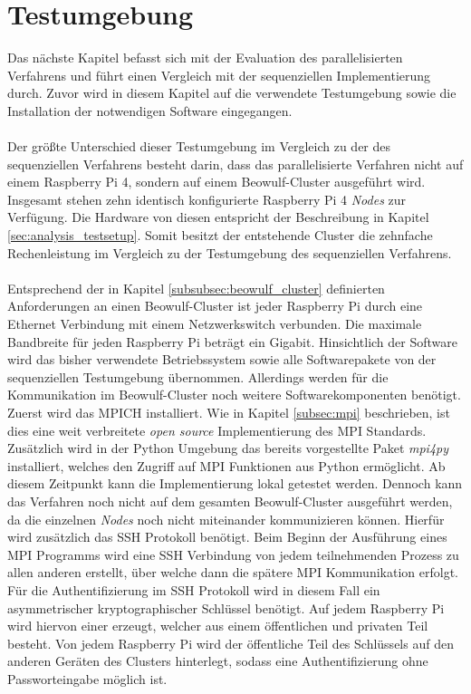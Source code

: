\section{Testumgebung}
\label{sec:test_env_parallel}
Das nächste Kapitel befasst sich mit der Evaluation des parallelisierten Verfahrens und führt einen Vergleich mit der sequenziellen Implementierung durch. Zuvor wird in diesem Kapitel auf die verwendete Testumgebung sowie die Installation der notwendigen Software eingegangen. 
\\\\
Der größte Unterschied dieser Testumgebung im Vergleich zu der des sequenziellen Verfahrens besteht darin, dass das parallelisierte Verfahren nicht auf einem Raspberry Pi 4, sondern auf einem Beowulf-Cluster ausgeführt wird. Insgesamt stehen zehn identisch konfigurierte Raspberry Pi 4 \emph{Nodes} zur Verfügung. Die Hardware von diesen entspricht der Beschreibung in Kapitel \ref{sec:analysis_testsetup}. Somit besitzt der entstehende Cluster die zehnfache Rechenleistung im Vergleich zu der Testumgebung des sequenziellen Verfahrens.
\\\\
Entsprechend  der in Kapitel \ref{subsubsec:beowulf_cluster} definierten Anforderungen an einen Beowulf-Cluster ist jeder Raspberry Pi durch eine Ethernet Verbindung mit einem Netzwerkswitch verbunden. Die maximale Bandbreite für jeden Raspberry Pi beträgt ein Gigabit. Hinsichtlich der Software wird das bisher verwendete Betriebssystem sowie alle Softwarepakete von der sequenziellen Testumgebung übernommen. Allerdings werden für die Kommunikation im Beowulf-Cluster noch weitere Softwarekomponenten benötigt. Zuerst wird das MPICH installiert. Wie in Kapitel \ref{subsec:mpi} beschrieben, ist dies eine weit verbreitete \emph{open source} Implementierung des \ac{MPI} Standards. Zusätzlich wird in der Python Umgebung das bereits vorgestellte Paket \emph{mpi4py} installiert, welches den Zugriff auf \ac{MPI} Funktionen aus Python ermöglicht. Ab diesem Zeitpunkt kann die Implementierung lokal getestet werden. Dennoch kann das Verfahren noch nicht auf dem gesamten Beowulf-Cluster ausgeführt werden, da die einzelnen \emph{Nodes} noch nicht miteinander kommunizieren können. Hierfür wird zusätzlich das \ac{SSH} Protokoll benötigt. Beim Beginn der Ausführung eines \ac{MPI} Programms wird eine \ac{SSH} Verbindung von jedem teilnehmenden Prozess zu allen anderen erstellt, über welche dann die spätere \ac{MPI} Kommunikation erfolgt. Für die Authentifizierung im \ac{SSH} Protokoll wird in diesem Fall ein asymmetrischer kryptographischer Schlüssel benötigt. Auf jedem Raspberry Pi wird hiervon einer erzeugt, welcher aus einem öffentlichen und privaten Teil besteht. Von jedem Raspberry Pi wird der öffentliche Teil des Schlüssels auf den anderen Geräten des Clusters hinterlegt, sodass eine Authentifizierung ohne Passworteingabe möglich ist.
